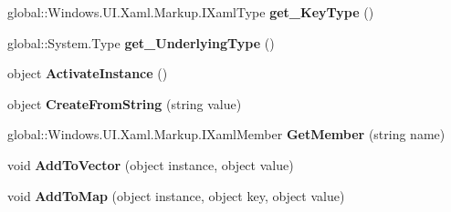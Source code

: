 \begin{DoxyCompactItemize}
\item 
\mbox{\label{interface_windows_1_1_u_i_1_1_xaml_1_1_markup_1_1_i_xaml_type_adf5ffe349502daca52cf3769f1c7826b}} 
global\+::\+Windows.\+U\+I.\+Xaml.\+Markup.\+I\+Xaml\+Type {\bfseries get\+\_\+\+Key\+Type} ()
\item 
\mbox{\label{interface_windows_1_1_u_i_1_1_xaml_1_1_markup_1_1_i_xaml_type_a83f6b45dec1d61427a84b05e9ba9dbfd}} 
global\+::\+System.\+Type {\bfseries get\+\_\+\+Underlying\+Type} ()
\item 
\mbox{\label{interface_windows_1_1_u_i_1_1_xaml_1_1_markup_1_1_i_xaml_type_a808e756aefac346cce2c570d35eb1f2d}} 
object {\bfseries Activate\+Instance} ()
\item 
\mbox{\label{interface_windows_1_1_u_i_1_1_xaml_1_1_markup_1_1_i_xaml_type_a510acbfd71efcb451b2b8f31416e9d57}} 
object {\bfseries Create\+From\+String} (string value)
\item 
\mbox{\label{interface_windows_1_1_u_i_1_1_xaml_1_1_markup_1_1_i_xaml_type_a431f90f38a00401842b28f5ee3917d54}} 
global\+::\+Windows.\+U\+I.\+Xaml.\+Markup.\+I\+Xaml\+Member {\bfseries Get\+Member} (string name)
\item 
\mbox{\label{interface_windows_1_1_u_i_1_1_xaml_1_1_markup_1_1_i_xaml_type_a9542f31b1f9a3d9698ca632ae1a207e2}} 
void {\bfseries Add\+To\+Vector} (object instance, object value)
\item 
\mbox{\label{interface_windows_1_1_u_i_1_1_xaml_1_1_markup_1_1_i_xaml_type_ab81b106f354f661a28e2fe7c1cf529fb}} 
void {\bfseries Add\+To\+Map} (object instance, object key, object value)
\item 
\mbox{\label{interface_windows_1_1_u_i_1_1_xaml_1_1_markup_1_1_i_xaml_type_a43defd106c74e1f61c00f36498126028}} 

\end{DoxyCompactItemize}
